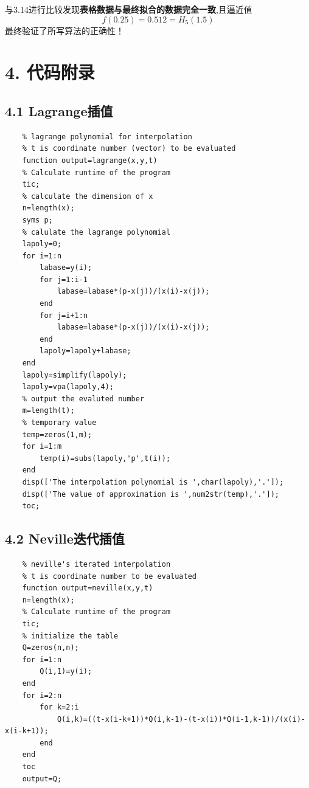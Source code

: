 \documentclass{article}
\begin{document}
\newpage

    与3.14进行比较发现\textbf{表格数据与最终拟合的数据完全一致},且逼近值
    $$f(0.25)=0.512=H_{5}(1.5)$$
    最终验证了所写算法的正确性！
   
\section{4. 代码附录}
    \subsection{4.1 Lagrange插值}
    \begin{lstlisting}
    % lagrange polynomial for interpolation
    % t is coordinate number (vector) to be evaluated
    function output=lagrange(x,y,t)
    % Calculate runtime of the program
    tic;
    % calculate the dimension of x
    n=length(x);
    syms p;
    % calulate the lagrange polynomial
    lapoly=0;
    for i=1:n
        labase=y(i);
        for j=1:i-1
            labase=labase*(p-x(j))/(x(i)-x(j));
        end
        for j=i+1:n
            labase=labase*(p-x(j))/(x(i)-x(j));
        end
        lapoly=lapoly+labase;
    end
    lapoly=simplify(lapoly);
    lapoly=vpa(lapoly,4);
    % output the evaluted number
    m=length(t);
    % temporary value
    temp=zeros(1,m);
    for i=1:m
        temp(i)=subs(lapoly,'p',t(i));
    end
    disp(['The interpolation polynomial is ',char(lapoly),'.']);
    disp(['The value of approximation is ',num2str(temp),'.']);
    toc;
    \end{lstlisting}

\subsection{4.2 Neville迭代插值}
    \begin{lstlisting}
    % neville's iterated interpolation 
    % t is coordinate number to be evaluated
    function output=neville(x,y,t)
    n=length(x);
    % Calculate runtime of the program
    tic;
    % initialize the table
    Q=zeros(n,n);
    for i=1:n
        Q(i,1)=y(i);
    end
    for i=2:n
        for k=2:i
            Q(i,k)=((t-x(i-k+1))*Q(i,k-1)-(t-x(i))*Q(i-1,k-1))/(x(i)-x(i-k+1));
        end
    end
    toc
    output=Q;
    \end{lstlisting}
\end{document}
